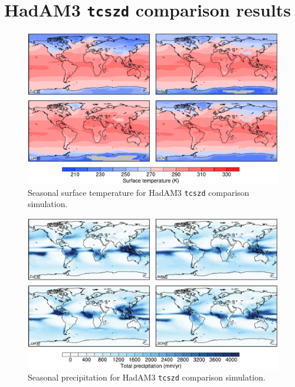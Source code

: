 \documentclass[a4paper,11pt]{article}
\begin{document}
\section{HadAM3 \texttt{tcszd} comparison results}
\label{sec:hadam3}

\begin{figure}
  \begin{center}
    \includegraphics[width=\textwidth]{../hadam3-comparison/plots/ts-plots}
  \end{center}
  \caption{Seasonal surface temperature for HadAM3 \texttt{tcszd}
    comparison simulation.}
  \label{fig:ts-hadam3}
\end{figure}

\begin{figure}
  \begin{center}
    \includegraphics[width=\textwidth]{../hadam3-comparison/plots/pp-plots}
  \end{center}
  \caption{Seasonal precipitation for HadAM3 \texttt{tcszd} comparison
    simulation.}
  \label{fig:pp-hadam3}
\end{figure}
\end{document}
